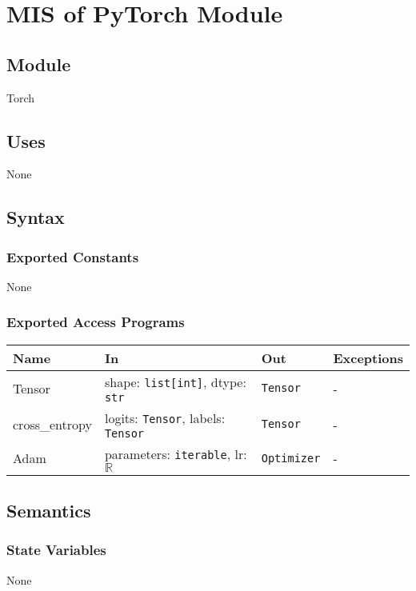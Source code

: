 \documentclass[12pt, titlepage]{article}
\begin{document}
\section{MIS of PyTorch Module} \label{TorchModule}

\subsection{Module}
Torch

\subsection{Uses}
None

\subsection{Syntax}

\subsubsection{Exported Constants}
None

\subsubsection{Exported Access Programs}

\begin{center}
\begin{tabular}{p{3.2cm} p{5.5cm} p{4cm} p{2.5cm}}
\hline
\textbf{Name} & \textbf{In} & \textbf{Out} & \textbf{Exceptions} \\
\hline
Tensor & shape: \texttt{list[int]}, dtype: \texttt{str} & \texttt{Tensor} & - \\
cross\_entropy & logits: \texttt{Tensor}, labels: \texttt{Tensor} & \texttt{Tensor} & - \\
Adam & parameters: \texttt{iterable}, lr: \(\mathbb{R}\) & \texttt{Optimizer} & - \\
\hline
\end{tabular}
\end{center}

\subsection{Semantics}

\subsubsection{State Variables}
None
\end{document}
